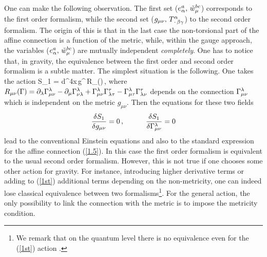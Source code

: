 One can make the following observation. The first set 
($e_\alpha^a,\,{\tilde w}^{bc}_\mu$) corresponds to the first order 
formalism, while the second set ($g_{\mu\nu},\,T^\alpha_{\,\cdot\,\beta\gamma}$)
to the second order formalism. The origin of this is that in the
last case the non-torsional part of the affine connection 
is a function of the metric, while, within the gauge approach, 
the variables ($e_\alpha^a,\,{\tilde w}^{bc}_\mu$) 
are mutually independent {\large\it completely}. 
One has to notice that, in gravity, 
the equivalence between the first order and second order 
formalism is a subtle matter. The simplest situation is the following. 
One takes the action
\beq
S_{1} = \int d^4x\,g^{\mu\nu}\,R_{\mu\nu}(\Ga)\,, 
\label{1st}
\eeq
where $R_{\mu\nu}(\Gamma)=\partial_\lambda\Gamma^\lambda_{\mu\nu}-
\partial_\mu\Gamma^\lambda_{\nu\lambda} + \Gamma^\lambda_{\mu\nu}\Gamma^\tau_{\lambda\tau}-
\Gamma^\lambda_{\mu\tau}\Gamma^\tau_{\lambda\nu}$ depends on the 
connection $\Gamma^\lambda_{\mu\nu}$ which is independent 
on the metric $g_{\mu\nu}$. Then the equations for these two 
fields 
$$
\frac{\delta S_{1}}{\delta g_{\mu\nu}}=0
\,,\,\,\,\,\,\,\,\,\,\,\,\,\,\,\,\,\,\,
\frac{\delta S_{1}}{\delta \Gamma^\lambda_{\mu\nu}}=0
$$
lead to the conventional Einstein equations and also to the 
standard expression for the affine connection (\ref{1.5}).
In this case the first order formalism is  
equivalent to the usual second order formalism.
However, this is not true if one chooses some
other action for gravity. For instance, introducing higher
derivative terms or adding to (\ref{1st}) additional terms 
depending on the non-metricity, one can indeed lose classical 
equivalence between two 
formalisms\footnote{We remark that on the quantum level there
is no equivalence even for the (\ref{1st}) action 
\cite{diplom}.}. For the general action, the only possibility to 
link the connection with the metric is to impose the 
metricity condition. 

